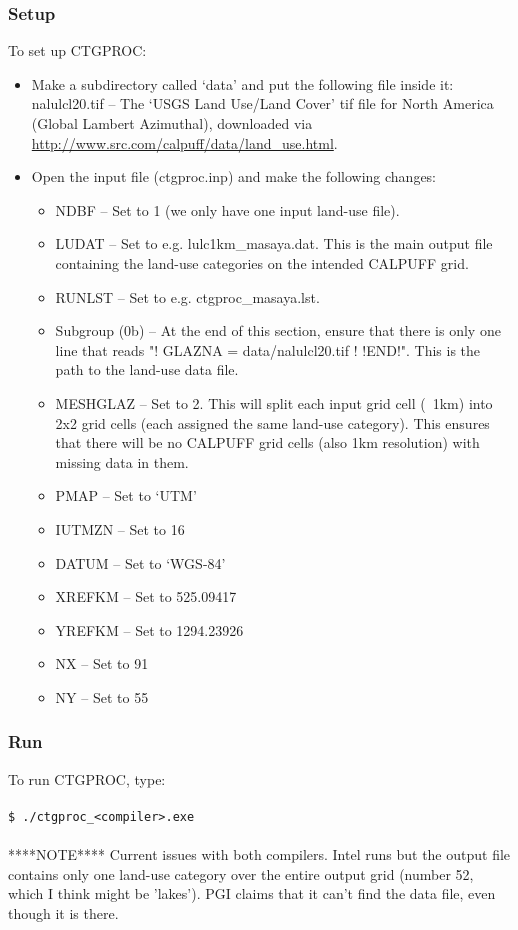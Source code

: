 \documentclass[10pt,a4paper]{article}
\newcommand\tab[1][0.5cm]{\hspace*{#1}}
\begin{document}
\subsubsection{Setup}
To set up CTGPROC:
\begin{itemize}
\item Make a subdirectory called `data' and put the following file inside it:
nalulcl20.tif -- The `USGS Land Use/Land Cover' tif file for North America (Global Lambert Azimuthal), downloaded via \url{http://www.src.com/calpuff/data/land_use.html}.
\item Open the input file (ctgproc.inp) and make the following changes:
\begin{itemize}
\item NDBF -- Set to 1 (we only have one input land-use file).
\item LUDAT -- Set to e.g. lulc1km\_masaya.dat. This is the main output file containing the land-use categories on the intended CALPUFF grid.
\item RUNLST -- Set to e.g. ctgproc\_masaya.lst.
\item Subgroup (0b) -- At the end of this section, ensure that there is only one line that reads "! GLAZNA  =  data/nalulcl20.tif !  !END!". This is the path to the land-use data file.
\item MESHGLAZ -- Set to 2. This will split each input grid cell (~1km) into 2x2 grid cells (each assigned the same land-use category). This ensures that there will be no CALPUFF grid cells (also 1km resolution) with missing data in them.
\item PMAP -- Set to `UTM'
\item IUTMZN -- Set to 16
\item DATUM -- Set to `WGS-84'
\item XREFKM -- Set to 525.09417
\item YREFKM -- Set to 1294.23926
\item NX -- Set to 91
\item NY -- Set to 55
\end{itemize}
\end{itemize}

\subsubsection{Run}
To run CTGPROC, type:\\\\
\tab \texttt{\$ ./ctgproc\_<compiler>.exe}\\\\
****NOTE**** Current issues with both compilers. Intel runs but the output file contains only one land-use category over the entire output grid (number 52, which I think might be 'lakes'). PGI claims that it can't find the data file, even though it is there.
\end{document}
